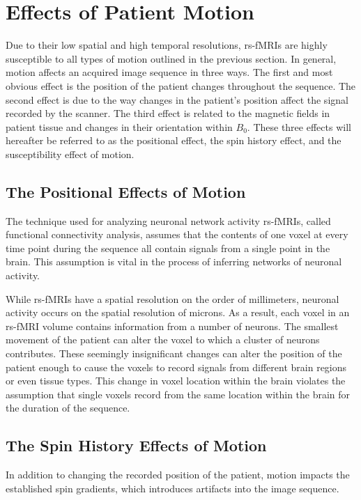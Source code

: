 \section{Effects of Patient Motion}

Due to their low spatial and high temporal resolutions, rs-fMRIs are highly susceptible to all types of motion outlined in the previous section. In general, motion affects an acquired image sequence in three ways. The first and most obvious effect is the position of the patient changes throughout the sequence. The second effect is due to the way changes in the patient's position affect the signal recorded by the scanner. The third effect is related to the magnetic fields in patient tissue and changes in their orientation within $B_0$. These three effects will hereafter be referred to as the positional effect, the spin history effect, and the susceptibility effect of motion.

\subsection{The Positional Effects of Motion}

The technique used for analyzing neuronal network activity rs-fMRIs, called functional connectivity analysis, assumes that the contents of one voxel at every time point during the sequence all contain signals from a single point in the brain. This assumption is vital in the process of inferring networks of neuronal activity. 

While rs-fMRIs have a spatial resolution on the order of millimeters, neuronal activity occurs on the spatial resolution of microns. As a result, each voxel in an rs-fMRI volume contains information from a number of neurons. The smallest movement of the patient can alter the voxel to which a cluster of neurons contributes. These seemingly insignificant changes can alter the position of the patient enough to cause the voxels to record signals from different brain regions or even tissue types. This change in voxel location within the brain violates the assumption that single voxels record from the same location within the brain for the duration of the sequence.

\subsection{The Spin History Effects of Motion}

In addition to changing the recorded position of the patient, motion impacts the established spin gradients, which introduces artifacts into the image sequence.

